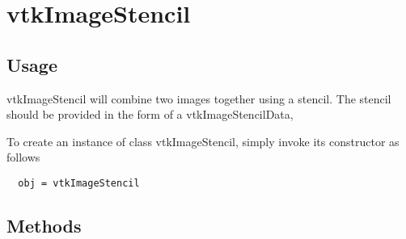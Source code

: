 \section{vtkImageStencil}

\subsection{Usage}

 vtkImageStencil will combine two images together using a stencil.
 The stencil should be provided in the form of a vtkImageStencilData,

To create an instance of class vtkImageStencil, simply
invoke its constructor as follows
\begin{verbatim}
  obj = vtkImageStencil
\end{verbatim}
\subsection{Methods}

